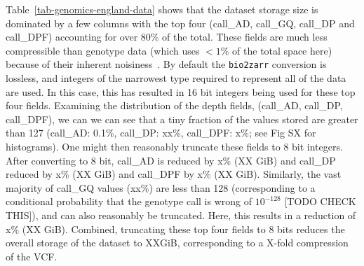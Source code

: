 \documentclass[a4paper,num-refs]{oup-contemporary}
\begin{document}

Table~\ref{tab-genomics-england-data} shows that the dataset storage
size is dominated by a few columns with the top four
(call\_AD, call\_GQ, call\_DP and call\_DPF) accounting for over 
80\% of the total. These fields are much less compressible
than genotype data (which uses $<1\%$ of the total space here)
because of their inherent noisiness~\citep{lin2020sparse}. By 
default the \texttt{bio2zarr} conversion is lossless, and integers
of the narrowest type required to represent all of the data are
used. In this case, this has resulted in 16 bit integers being used 
for these top four fields. Examining the distribution of the depth
fields, (call\_AD, call\_DP, call\_DPF), we can 
we can see that a tiny fraction of the values stored
are greater than 127 (call\_AD: 0.1\%, call\_DP: xx\%, call\_DPF: x\%; see 
Fig SX for histograms).
One might then reasonably truncate these fields to 8 bit integers.
After converting to 8 bit, call\_AD is reduced by 
x\% (XX GiB) and call\_DP reduced by x\% (XX GiB)
and call\_DPF by x\% (XX GiB). 
Similarly, the vast majority of call\_GQ values (xx\%) are less than 
128 (corresponding to a conditional probability that the genotype call is 
wrong of $10^{-128}$ [TODO CHECK THIS]), and can also reasonably
be truncated. Here, this results in a reduction of x\% (XX GiB).
Combined, truncating these top four fields to 8 bits reduces the 
overall storage of the dataset to XXGiB, corresponding to a 
X-fold compression of the VCF.

\end{document}
